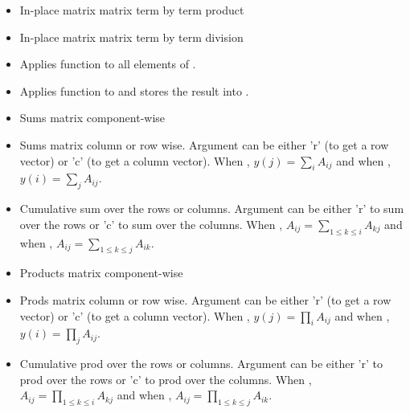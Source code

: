 \begin{itemize}
\item {} 
  \sshortdescribe In-place matrix matrix term by term product  

\item {} 
  \sshortdescribe In-place matrix matrix term by term division

\item {} 
  \sshortdescribe Applies function  to all elements of .

\item {} 
  \sshortdescribe Applies function  to  and stores the result
  into .

\item {}
  \sshortdescribe Sums matrix component-wise  

\item {}
  \sshortdescribe Sums matrix column or row wise. Argument  can be
  either 'r' (to get a row vector) or 'c' (to get a column vector). When
  , $y(j) = \sum_i A_{ij}$ and when , $y(i) = \sum_j
  A_{ij}$.

\item {} 
  \sshortdescribe Cumulative sum over the rows or columns. Argument 
  can be either 'r' to sum over the rows or 'c' to sum over the columns. When
  , $A_{ij} = \sum_{1 \le k \le i} A_{kj}$ and when , 
  $A_{ij} = \sum_{1 \le k \le j} A_{ik}$.

\item {}
  \sshortdescribe Products matrix component-wise

\item {}
  \sshortdescribe Prods matrix column or row wise. Argument  can be
  either 'r' (to get a row vector) or 'c' (to get a column vector). When
  , $y(j) = \prod_i A_{ij}$ and when , $y(i) = \prod_j
  A_{ij}$.

\item {} 
  \sshortdescribe Cumulative prod over the rows or columns. Argument 
  can be either 'r' to prod over the rows or 'c' to prod over the columns. When
  , $A_{ij} = \prod_{1 \le k \le i} A_{kj}$ and when , 
  $A_{ij} = \prod_{1 \le k \le j} A_{ik}$.
\end{itemize}

